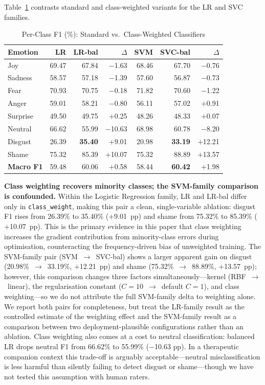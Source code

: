 \documentclass[sigconf, review=true]{acmart}
\begin{document}
Table~\ref{tab:perclass} contrasts standard and class-weighted
variants for the LR and SVC families.

\begin{table}[t]
\centering
\caption{Per-Class F1 (\%): Standard vs.\ Class-Weighted Classifiers}
\label{tab:perclass}
\begin{tabular}{lrrrrrr}
\toprule
\textbf{Emotion} &
\textbf{LR} & \textbf{LR-bal} & \textbf{$\Delta$} &
\textbf{SVM} & \textbf{SVC-bal} & \textbf{$\Delta$} \\
\midrule
Joy      & 69.47 & 67.84 & $-$1.63 & 68.46 & 67.70 & $-$0.76 \\
Sadness  & 58.57 & 57.18 & $-$1.39 & 57.60 & 56.87 & $-$0.73 \\
Fear     & 70.93 & 70.75 & $-$0.18 & 71.82 & 70.60 & $-$1.22 \\
Anger    & 59.01 & 58.21 & $-$0.80 & 56.11 & 57.02 & $+$0.91 \\
Surprise & 49.50 & 49.75 & $+$0.25 & 48.26 & 48.33 & $+$0.07 \\
Neutral  & 66.62 & 55.99 & $-$10.63& 68.98 & 60.78 & $-$8.20 \\
Disgust  & 26.39 & \textbf{35.40} & $+$9.01  &
           20.98 & \textbf{33.19} & $+$12.21 \\
Shame    & 75.32 & 85.39 & $+$10.07 & 75.32 & 88.89 & $+$13.57 \\
\midrule
\textbf{Macro F1} & 59.48 & 60.06 & $+$0.58 &
                    58.44 & \textbf{60.42} & $+$1.98 \\
\bottomrule
\end{tabular}
\end{table}

\textbf{Class weighting recovers minority classes; the SVM-family
comparison is confounded.}
Within the Logistic Regression family, LR and LR-bal differ only
in \texttt{class\_weight}, making this pair a clean, single-variable
ablation: disgust F1 rises from 26.39\% to 35.40\% ($+$9.01~pp)
and shame from 75.32\% to 85.39\% ($+$10.07~pp).
This is the primary evidence in this paper that class weighting
increases the gradient contribution from minority-class errors
during optimisation, counteracting the frequency-driven bias of
unweighted training.
The SVM-family pair (SVM~$\to$~SVC-bal) shows a larger apparent
gain on disgust (20.98\%~$\to$~33.19\%, $+$12.21~pp) and shame
(75.32\%~$\to$~88.89\%, $+$13.57~pp); however, this comparison
changes three factors simultaneously---kernel (RBF~$\to$~linear),
the regularisation constant ($C{=}10$~$\to$~default $C{=}1$), and
class weighting---so we do not attribute the full SVM-family
delta to weighting alone.
We report both pairs for completeness, but treat the LR-family
result as the controlled estimate of the weighting effect and
the SVM-family result as a comparison between two
deployment-plausible configurations rather than an ablation.
Class weighting also comes at a cost to neutral classification:
balanced LR drops neutral F1 from 66.62\% to 55.99\%
($-$10.63 pp).
In a therapeutic companion context this trade-off is arguably
acceptable---neutral misclassification is less harmful than
silently failing to detect disgust or shame---though we have not
tested this assumption with human raters.
\end{document}
